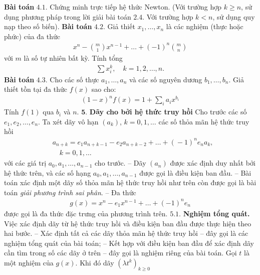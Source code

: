 \begin{multicols}{2}
	\textbf{\color{hoccungpi}Bài toán} $\pmb{4.1.}$ Chứng minh trực tiếp hệ thức Newton. 
			(Với trường hợp $k\geq n$, sử dụng phương pháp trong lời giải bài toán $2.4$. Với trường hợp $k<n$, sử dụng quy nạp theo số biến).
	\vskip 0.1cm
	\textbf{\color{hoccungpi}Bài toán} $\pmb{4.2.}$  Giả thiết $x_1,\ldots,x_n$ là các nghiệm (thực hoặc phức) của đa thức
	\begin{align*}
		x^n-{m\choose 1}x^{n-1}+\ldots+(-1)^n{m\choose n}
	\end{align*}
	với $m$ là số tự nhiên bất kỳ.
	Tính tổng
	\begin{align*}
		\sum x_i^k,\quad k=1,2,\ldots,n.
	\end{align*} 
	\textbf{\color{hoccungpi}Bài toán} $\pmb{4.3.}$
	Cho các số thực $a_1,\ldots,a_n$ và các số nguyên dương $b_1,\ldots,b_n$. Giả thiết tồn tại đa thức $f(x)$ sao cho:
	\begin{align*}
		(1-x)^nf(x)=1+\sum_i a_ix^{b_i}
	\end{align*}
	Tính $f(1)$ qua $b_i$ và $n$.
	\vskip 0.1cm
	$\pmb{5.}$ \textbf{\color{hoccungpi}Dãy cho bởi hệ thức truy hồi}
	\vskip 0.1cm
	Cho trước các số $e_1,e_2,\ldots,e_n$. Ta xét dãy vô hạn $(a_k)$, $k=0,1,\ldots$ các số thỏa mãn { hệ thức truy hồi}
	\begin{align*}
		&a_{n\!+\!k}\!=\!e_1a_{n\!+\!k\!-\!1}\!-\!e_2a_{n\!+\!k\!-\!2}\!+\!\ldots\!+\!(\!-\!1)^{n}e_na_k,\\
		&\quad k=0, 1,\ldots
	\end{align*}
	với các giá trị  $a_0,a_1,\ldots,a_{n-1}$ cho trước. 
	\vskip 0.1cm	
	-- Dãy $(a_n)$ được xác định duy nhất bởi hệ thức trên, và các số hạng
			$a_0, a_1,\ldots, a_{n-1}$ được gọi là {  điều kiện ban đầu}.
	\vskip 0.1cm  
	--	Bài toán xác định một dãy số thỏa mãn hệ thức truy hồi như trên còn được gọi là bài toán {\em giải phương trình sai phân}. 
	\vskip 0.1cm
	-- Đa thức 
	\begin{align*}
		g(x)=x^n-e_1x^{n-1}+\ldots+(-1)^n e_n
	\end{align*}
	được gọi là { đa thức đặc trưng} của phương trình trên.
	\vskip 0.1cm
	$\pmb{5.1.}$ \textbf{\color{hoccungpi}Nghiệm tổng quát.} 
	Việc xác định dãy từ hệ thức truy hồi và điều kiện ban đầu được thực hiện theo hai bước.
	\vskip 0.1cm
	--  Xác định tất cả các dãy thỏa mãn hệ thức truy hồi -- đây gọi là { các nghiệm tổng quát} của bài toán;
	\vskip 0.1cm
	--  Kết hợp với điều kiện ban đầu để xác định dãy cần tìm trong số các dãy ở trên -- đây gọi là { nghiệm riêng} của bài toán.
	\vskip 0.1cm	
	Gọi $t$ là một nghiệm của $g(x)$. Khi đó dãy $(\lambda t^k)_{k\geq 0}$

\end{multicols}
